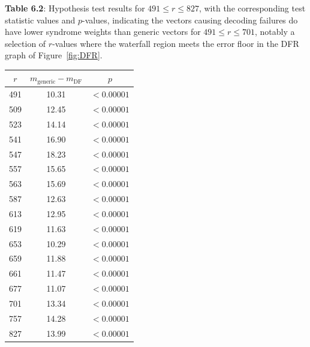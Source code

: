 \begin{flushleft}
\textbf{Table 6.2}: Hypothesis test results for $491 \leq r \leq 827$, with the corresponding test statistic values and $p$-values, indicating the vectors causing decoding failures do have lower syndrome weights than generic vectors for $491 \leq r \leq 701$, notably a selection of $r$-values where the waterfall region meets the error floor in the DFR graph of Figure~\ref{fig:DFR}.
\end{flushleft}
\begin{table}[ht]\label{table:hyp_test_ts_and_ps}
\centering
\begin{tabular}{c|c|c}
$r$   & $m_{\text{generic}} - m_{\text{DF}}$ & $p$                \\
\hline
491 & 10.31			     & $< 0.00001$ \\
509 & 12.45                          & $< 0.00001$ \\
523 & 14.14                          & $< 0.00001$ \\
541 & 16.90                          & $< 0.00001$ \\
547 & 18.23                          & $< 0.00001$ \\
557 & 15.65                          & $< 0.00001$ \\
563 & 15.69                          & $< 0.00001$ \\
587 & 12.63                          & $< 0.00001$ \\
613 & 12.95                          & $< 0.00001$ \\
619 & 11.63                          & $< 0.00001$ \\
653 & 10.29                          & $< 0.00001$ \\
659 & 11.88                          & $< 0.00001$ \\
661 & 11.47                          & $< 0.00001$ \\
677 & 11.07                          & $< 0.00001$ \\
701 & 13.34                          & $< 0.00001$ \\
757 & 14.28                          & $< 0.00001$ \\
827 & 13.99                          & $< 0.00001$ \\

\end{tabular}

\end{table}



